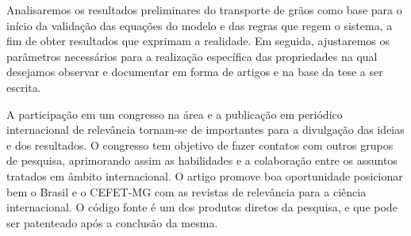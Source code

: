 Analisaremos os resultados preliminares do transporte de grãos como base para o início da validação das equações do modelo e das regras que regem o sistema, a fim de obter resultados que exprimam a realidade. Em seguida, ajustaremos os parâmetros necessários para a realização específica das propriedades na qual desejamos observar e documentar em forma de artigos e na base da tese a ser escrita.

A participação em um congresso na área e a publicação em periódico internacional de relevância tornam-se de importantes para a divulgação das ideias e dos resultados. O congresso tem objetivo de fazer contatos com outros grupos de pesquisa, aprimorando assim as habilidades e a colaboração entre os assuntos tratados em âmbito internacional. O artigo promove boa oportunidade posicionar bem o Brasil e o CEFET-MG com as revistas de relevância para a ciência internacional. O código fonte é um dos produtos diretos da pesquisa, e que pode ser patenteado após a conclusão da mesma.

